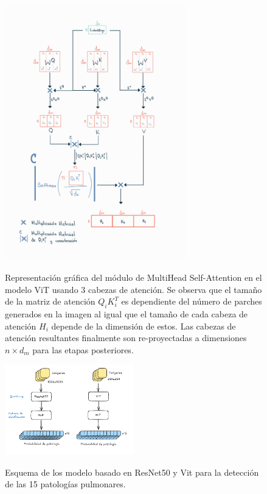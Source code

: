 \begin{figure}[htp]
    \centering
    {\includegraphics[width=0.7\textwidth]{Chapters/4. ViT-Lung/images/cabezas_vit.jpg}}
\caption{Representación gráfica del módulo de MultiHead Self-Attention en el modelo ViT usando 3 cabezas
         de atención. Se observa
         que el tamaño de la matriz de atención $Q_i K_i^T$ es dependiente del número de parches
         generados en la imagen al igual que el tamaño de cada cabeza de atención $H_i$ depende de
         la dimensión de estos. Las cabezas de atención resultantes finalmente son re-proyectadas
         a dimensiones $n \times d_m$ para las etapas posteriores. }
\label{vit-head-dim}
\end{figure}


\begin{figure}[htp]
    \centering
    {\includegraphics[width=0.5\textwidth]{Chapters/4. ViT-Lung/images/both_models.png}}
\caption{Esquema de los modelo basado en ResNet50 y Vit para la detección de las 15 patologías pulmonares.}
\label{net_both}
\end{figure}


